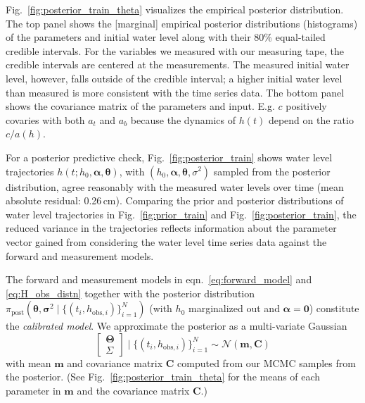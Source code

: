 \documentclass[a4paper,fleqn]{cas-dc}
\newcommand\thedatanomath {\{(t_i,h_{\text{obs}, i})\}_{i=1}^{N}}
\newcommand\themodel {$h(t; h_0, \boldsymbol \alpha, \boldsymbol\theta)$\xspace}
\newcommand\thevars{h_0, \boldsymbol \alpha, \boldsymbol \theta, \sigma^2}
\begin{document}

Fig.~\ref{fig:posterior_train_theta} visualizes the empirical posterior distribution. 
The top panel shows the [marginal] empirical posterior distributions (histograms) of the parameters and initial water level along with their 80\% equal-tailed credible intervals. 
For the variables we measured with our measuring tape, the credible intervals are centered at the measurements. 
The measured initial water level, however, falls outside of the credible interval; a higher initial water level than measured is more consistent with the time series data.
The bottom panel shows the covariance matrix of the parameters and input. E.g. $c$ positively covaries with both $a_t$ and $a_b$ because the dynamics of $h(t)$ depend on the ratio $c/a(h)$.



For a posterior predictive check, Fig.~\ref{fig:posterior_train} shows water level trajectories \themodel, with $(\thevars)$ sampled from the posterior distribution, agree reasonably with the measured water levels over time (mean absolute residual: 0.26\,cm). 
Comparing the prior and posterior distributions of water level trajectories in Fig.~\ref{fig:prior_train} and Fig.~\ref{fig:posterior_train}, the reduced variance in the trajectories reflects information about the parameter vector gained from considering the water level time series data against the forward and measurement models.



The forward and measurement models in eqn.~\ref{eq:forward_model} and \ref{eq:H_obs_distn} together with the posterior distribution $\pi_{\text{post}}(\boldsymbol \theta, \boldsymbol \sigma^2 \mid \thedatanomath)$ (with $h_0$ marginalized out and $\boldsymbol \alpha=\mathbf{0}$) constitute the \emph{calibrated model}.
We approximate the posterior as a multi-variate Gaussian
\begin{equation}
	\begin{bmatrix} \boldsymbol \Theta \\ \Sigma \end{bmatrix} \mid \thedatanomath \sim \mathcal{N}(\mathbf{m}, \mathbf{C}) \label{eq:post_theta_sigma}
\end{equation}
with mean $\mathbf{m}$ and covariance matrix $\mathbf{C}$ computed from our MCMC samples from the posterior. 
(See Fig.~\ref{fig:posterior_train_theta} for the means of each parameter in $\mathbf{m}$ and the covariance matrix $\mathbf{C}$.)
\end{document}
